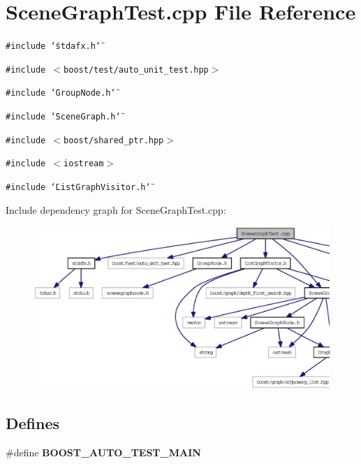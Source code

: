 \section{SceneGraphTest.cpp File Reference}
\label{SceneGraphTest_8cpp}


{\tt \#include \char`\"{}stdafx.h\char`\"{}}\par
{\tt \#include $<$boost/test/auto\_\-unit\_\-test.hpp$>$}\par
{\tt \#include \char`\"{}GroupNode.h\char`\"{}}\par
{\tt \#include \char`\"{}SceneGraph.h\char`\"{}}\par
{\tt \#include $<$boost/shared\_\-ptr.hpp$>$}\par
{\tt \#include $<$iostream$>$}\par
{\tt \#include \char`\"{}ListGraphVisitor.h\char`\"{}}\par


Include dependency graph for SceneGraphTest.cpp:\nopagebreak
\begin{figure}[H]
\begin{center}
\leavevmode
\includegraphics[width=420pt]{SceneGraphTest_8cpp__incl}
\end{center}
\end{figure}
\subsection*{Defines}
\begin{CompactItemize}
\item 
\#define {\bf BOOST\_\-AUTO\_\-TEST\_\-MAIN}
\end{CompactItemize}
